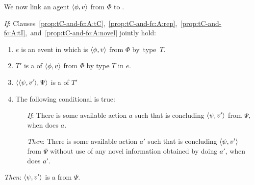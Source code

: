 \begin{note}
  We now link an agent \tCV{} \(\langle \phi, v \rangle\) from \(\Phi\) to .

  \begin{proposition}
    \label{prop:tC-and-fc}

    \noindent%

    \begin{itenum}
    \item[\emph{If}:]
      Clauses~\ref{prop:tC-and-fc:A:tC},~\ref{prop:tC-and-fc:A:rep},~\ref{prop:tC-and-fc:A:tI},~and~\ref{prop:tC-and-fc:A:novel} jointly hold:
      \begin{enumerate}[label=\arabic*., ref=(\arabic*)]
      \item
        \label{prop:tC-and-fc:A:tC}
        \(e\) is an event in which \vAgent{} is  \(\langle \phi, v \rangle\) from \(\Phi\) by~type~\(T\).
      \item
        \label{prop:tC-and-fc:A:rep}
        \(T'\) is a \tRep{} of \vAgent{} \tCV{} \(\langle \phi, v \rangle\) from \(\Phi\) by type \(T\) in \(e\).
      \item
        \label{prop:tC-and-fc:A:tI}
        \(\langle \langle \psi, v' \rangle, \Psi \rangle\) is a \tI{} of \(T'\)
      \item
        \label{prop:tC-and-fc:A:novel}
        The following conditional is true:
        \begin{itemize}
        \item[\emph{If}:]
          There is some available action \(a\) such that \vAgent{} is concluding \(\langle \psi, v' \rangle\) from \(\Psi\), when \vAgent{} does \(a\).
        \item[\emph{Then}:]
          There is some available action \(a'\) such that \vAgent{} is concluding \(\langle \psi, v' \rangle\) from \(\Psi\) without use of any novel information obtained by doing \(a'\), when \vAgent{} does \(a'\).
        \end{itemize}
      \end{enumerate}
    \item[\emph{Then}:]
      \(\langle \psi, v' \rangle\) is a \fc{} from \(\Psi\).
    \end{itenum}
    \vspace{-\baselineskip}
  \end{proposition}


\end{note}
